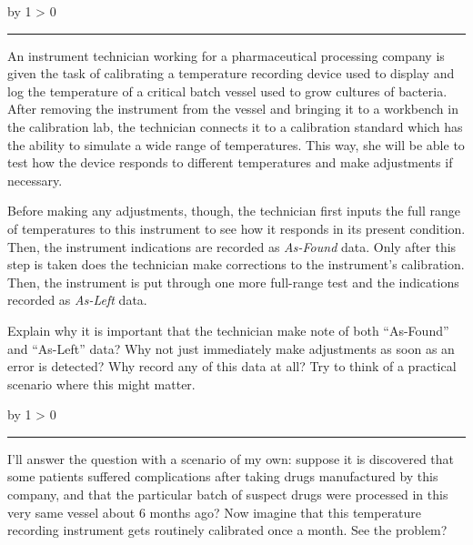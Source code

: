 \documentclass[12pt,a4paper]{article}
\def\oppgave{
            \advance\questnum by 1
            \ifnum \questnum > 0
                 \hrule
                 \vskip 3pt
                 \leftline{Oppgave \the\questnum}
                 \vskip 3pt \fi}
\def\svar{
           \advance\answnum by 1
           \ifnum \answnum > 0
                \hrule
                \vskip 3pt
                \leftline{Svar \the\answnum}
                \vskip 3pt \fi}
\begin{document}

\vfil \eject 



\oppgave{} 

An instrument technician working for a pharmaceutical processing company is given the task of calibrating a temperature recording device used to display and log the temperature of a critical batch vessel used to grow cultures of bacteria.  After removing the instrument from the vessel and bringing it to a workbench in the calibration lab, the technician connects it to a calibration standard which has the ability to simulate a wide range of temperatures.  This way, she will be able to test how the device responds to different temperatures and make adjustments if necessary.

Before making any adjustments, though, the technician first inputs the full range of temperatures to this instrument to see how it responds in its present condition.  Then, the instrument indications are recorded as {\it As-Found} data.  Only after this step is taken does the technician make corrections to the instrument's calibration.  Then, the instrument is put through one more full-range test and the indications recorded as {\it As-Left} data.

Explain why it is important that the technician make note of both ``As-Found'' and ``As-Left'' data?  Why not just immediately make adjustments as soon as an error is detected?  Why record any of this data at all?  Try to think of a practical scenario where this might matter.

\vskip 10pt \filbreak 





\svar{} 

I'll answer the question with a scenario of my own: suppose it is discovered that some patients suffered complications after taking drugs manufactured by this company, and that the particular batch of suspect drugs were processed in this very same vessel about 6 months ago?  Now imagine that this temperature recording instrument gets routinely calibrated once a month.  See the problem?

\vskip 10pt \filbreak 
\end{document}

